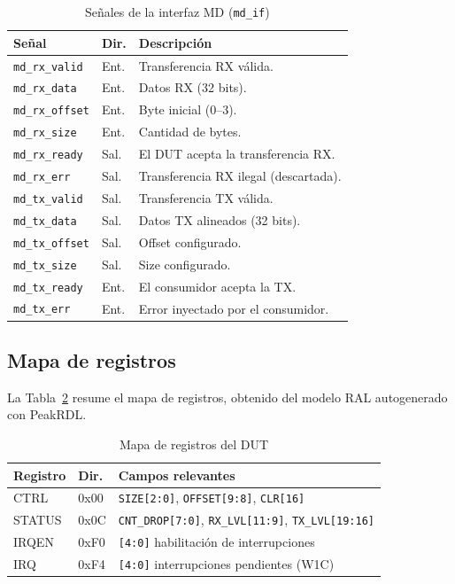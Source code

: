\documentclass[conference]{IEEEtran}
\begin{document}
\begin{table}[H]
\caption{Señales de la interfaz MD (\texttt{md\_if})}
\label{tab:md}
\centering
\footnotesize
\begin{tabular}{@{}llp{4.6cm}@{}}
\toprule
\textbf{Señal} & \textbf{Dir.} & \textbf{Descripción} \\
\midrule
\texttt{md\_rx\_valid}  & Ent. & Transferencia RX válida. \\
\texttt{md\_rx\_data}   & Ent. & Datos RX (32 bits). \\
\texttt{md\_rx\_offset} & Ent. & Byte inicial (0--3). \\
\texttt{md\_rx\_size}   & Ent. & Cantidad de bytes. \\
\texttt{md\_rx\_ready}  & Sal. & El DUT acepta la transferencia RX. \\
\texttt{md\_rx\_err}    & Sal. & Transferencia RX ilegal (descartada). \\
\texttt{md\_tx\_valid}  & Sal. & Transferencia TX válida. \\
\texttt{md\_tx\_data}   & Sal. & Datos TX alineados (32 bits). \\
\texttt{md\_tx\_offset} & Sal. & Offset configurado. \\
\texttt{md\_tx\_size}   & Sal. & Size configurado. \\
\texttt{md\_tx\_ready}  & Ent. & El consumidor acepta la TX. \\
\texttt{md\_tx\_err}    & Ent. & Error inyectado por el consumidor. \\
\bottomrule
\end{tabular}
\end{table}

\subsection{Mapa de registros}
La Tabla~\ref{tab:registros} resume el mapa de registros, obtenido del modelo RAL
autogenerado con PeakRDL.

\begin{table}[H]
\caption{Mapa de registros del DUT}
\label{tab:registros}
\centering
\footnotesize
\begin{tabular}{@{}llp{4.0cm}@{}}
\toprule
\textbf{Registro} & \textbf{Dir.} & \textbf{Campos relevantes} \\
\midrule
CTRL   & 0x00 & \texttt{SIZE[2:0]}, \texttt{OFFSET[9:8]}, \texttt{CLR[16]} \\
STATUS & 0x0C & \texttt{CNT\_DROP[7:0]}, \texttt{RX\_LVL[11:9]}, \texttt{TX\_LVL[19:16]} \\
IRQEN  & 0xF0 & \texttt{[4:0]} habilitación de interrupciones \\
IRQ    & 0xF4 & \texttt{[4:0]} interrupciones pendientes (W1C) \\
\bottomrule
\end{tabular}
\end{table}
\end{document}
